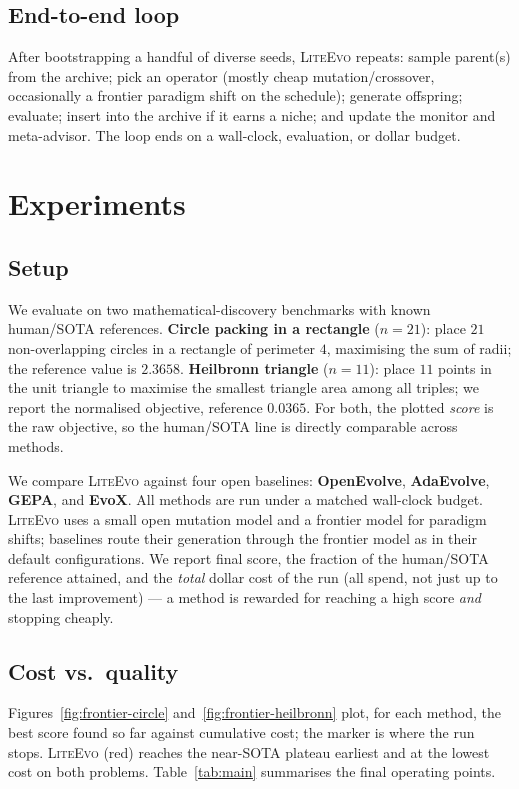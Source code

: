\documentclass[10pt,twocolumn]{article}
\newcommand{\liteevo}{\textsc{LiteEvo}}
\begin{document}
\subsection{End-to-end loop}
After bootstrapping a handful of diverse seeds, \liteevo{} repeats: sample
parent(s) from the archive; pick an operator (mostly cheap mutation/crossover,
occasionally a frontier paradigm shift on the schedule); generate offspring;
evaluate; insert into the archive if it earns a niche; and update the monitor
and meta-advisor. The loop ends on a wall-clock, evaluation, or dollar budget.

\section{Experiments}
\label{sec:experiments}

\subsection{Setup}
We evaluate on two mathematical-discovery benchmarks with known human/SOTA
references. \textbf{Circle packing in a rectangle} ($n{=}21$): place $21$
non-overlapping circles in a rectangle of perimeter $4$, maximising the sum of
radii; the reference value is $2.3658$. \textbf{Heilbronn triangle}
($n{=}11$): place $11$ points in the unit triangle to maximise the smallest
triangle area among all triples; we report the normalised objective, reference
$0.0365$. For both, the plotted \emph{score} is the raw objective, so the
human/SOTA line is directly comparable across methods.

We compare \liteevo{} against four open baselines: \textbf{OpenEvolve},
\textbf{AdaEvolve}, \textbf{GEPA}, and \textbf{EvoX}. All methods are run under
a matched wall-clock budget. \liteevo{} uses a small open mutation model and a
frontier model for paradigm shifts; baselines route their generation through
the frontier model as in their default configurations. We report final score,
the fraction of the human/SOTA reference attained, and the \emph{total} dollar
cost of the run (all spend, not just up to the last improvement) --- a method is
rewarded for reaching a high score \emph{and} stopping cheaply.

\subsection{Cost vs.\ quality}
Figures~\ref{fig:frontier-circle} and~\ref{fig:frontier-heilbronn} plot, for
each method, the best score found so far against cumulative cost; the marker is
where the run stops. \liteevo{} (red) reaches the near-SOTA plateau earliest
and at the lowest cost on both problems. Table~\ref{tab:main} summarises the
final operating points.
\end{document}
